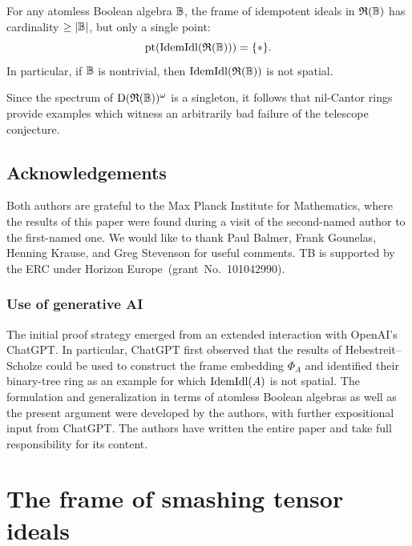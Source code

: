 \documentclass{amsart}
\begin{document}
    \begin{MainThm}\label{mainthm:idempotent}
        For any atomless Boolean algebra $\mathbb{B}$, the frame of idempotent ideals in $\mathfrak{R}(\mathbb{B})$ has cardinality $\geq \lvert\mathbb{B}\rvert$, but only a single point:
            \[
                \operatorname{pt}(\mathrm{IdemIdl}(\mathfrak{R}(\mathbb{B}))) = \{\ast\}.
            \]
        In particular, if $\mathbb{B}$ is nontrivial, then $\mathrm{IdemIdl}(\mathfrak{R}(\mathbb{B}))$ is not spatial.
    \end{MainThm}
    
   Since the spectrum of $\operatorname{D}(\mathfrak{R}(\mathbb{B}))^{\omega}$ is a singleton, it follows that nil-Cantor rings provide examples which witness an arbitrarily bad failure of the telescope conjecture.
    
    \subsection{Acknowledgements}
    
    Both authors are grateful to the Max Planck Institute for Mathematics, where the results of this paper were found during a visit of the second-named author to the first-named one. We would like to thank Paul Balmer, Frank Gounelas, Henning Krause, and Greg Stevenson for useful comments. TB is supported by the ERC under Horizon Europe~(grant~No.~101042990).
    
    \subsubsection*{Use of generative AI}
    The initial proof strategy emerged from an extended interaction with OpenAI's ChatGPT. In particular, ChatGPT first observed that the results of Hebestreit--Scholze \cite{hebestreit2024note} could be used to construct the frame embedding $\Phi_A$ and identified their binary-tree ring as an example for which $\mathrm{IdemIdl}(A)$ is not spatial. The formulation and generalization in terms of atomless Boolean algebras as well as the present argument were developed by the authors, with further expositional input from ChatGPT. The authors have written the entire paper and take full responsibility for its content.

    \section{The frame of smashing tensor ideals}
\end{document}
